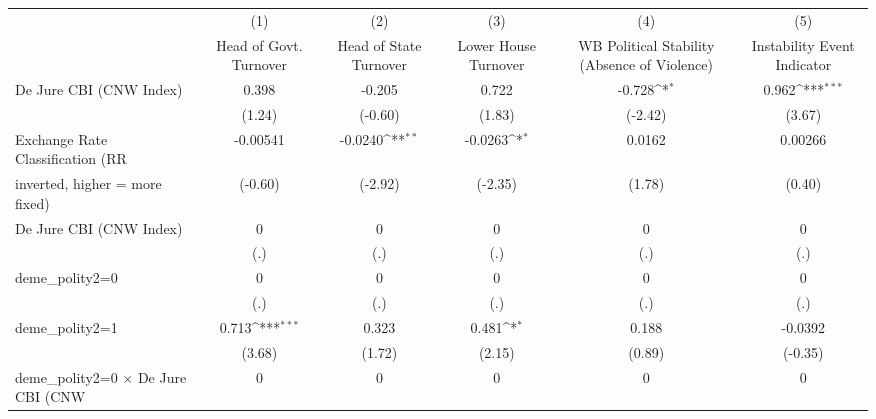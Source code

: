 {
\def\sym#1{\ifmmode^{#1}\else\(^{#1}\)\fi}
\begin{tabular}{l*{5}{c}}
\toprule
                                        &\multicolumn{1}{c}{(1)}&\multicolumn{1}{c}{(2)}&\multicolumn{1}{c}{(3)}&\multicolumn{1}{c}{(4)}&\multicolumn{1}{c}{(5)}\\
                                        &\multicolumn{1}{c}{Head of Govt. Turnover}&\multicolumn{1}{c}{Head of State Turnover}&\multicolumn{1}{c}{Lower House Turnover}&\multicolumn{1}{c}{WB Political Stability (Absence of Violence)}&\multicolumn{1}{c}{Instability Event Indicator}\\
\midrule
De Jure CBI (CNW Index)                 &     0.398         &    -0.205         &     0.722         &    -0.728\sym{*}  &     0.962\sym{***}\\
                                        &    (1.24)         &   (-0.60)         &    (1.83)         &   (-2.42)         &    (3.67)         \\
\addlinespace
Exchange Rate Classification (RR        &  -0.00541         &   -0.0240\sym{**} &   -0.0263\sym{*}  &    0.0162         &   0.00266         \\
inverted, higher = more fixed)          &   (-0.60)         &   (-2.92)         &   (-2.35)         &    (1.78)         &    (0.40)         \\
\addlinespace
De Jure CBI (CNW Index)                 &         0         &         0         &         0         &         0         &         0         \\
                                        &       (.)         &       (.)         &       (.)         &       (.)         &       (.)         \\
\addlinespace
deme\_polity2=0                          &         0         &         0         &         0         &         0         &         0         \\
                                        &       (.)         &       (.)         &       (.)         &       (.)         &       (.)         \\
\addlinespace
deme\_polity2=1                          &     0.713\sym{***}&     0.323         &     0.481\sym{*}  &     0.188         &   -0.0392         \\
                                        &    (3.68)         &    (1.72)         &    (2.15)         &    (0.89)         &   (-0.35)         \\
\addlinespace
deme\_polity2=0 $\times$ De Jure CBI (CNW&         0         &         0         &         0         &         0         &         0         \\

\end{tabular}}
